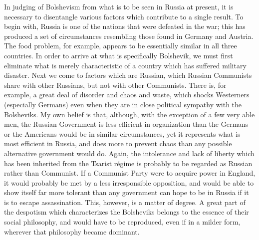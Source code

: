 In judging of Bolshevism from what is to be seen in Russia at present, it is necessary to disentangle various factors which contribute to a single result. To begin with, Russia is one of the nations that were defeated in the war; this has produced a set of circumstances resembling those found in Germany and Austria. The food problem, for example, appears to be essentially similar in all three countries. In order to arrive at what is specifically Bolshevik, we must first eliminate what is merely characteristic of a country which has suffered military disaster. Next we come to factors which are Russian, which Russian Communists share with other Russians, but not with other Communists. There is, for example, a great deal of disorder and chaos and waste, which shocks Westerners (especially Germans) even when they are in close political sympathy with the Bolsheviks. My own belief is that, although, with the exception of a few very able men, the Russian Government is less efficient in organization than the Germans or the Americans would be in similar circumstances, yet it represents what is most efficient in Russia, and does more to prevent chaos than any possible alternative government would do. Again, the intolerance and lack of liberty which has been inherited from the Tsarist régime is probably to be regarded as Russian rather than Communist. If a Communist Party were to acquire power in England, it would probably be met by a less irresponsible opposition, and would be able to show itself far more tolerant than any government can hope to be in Russia if it is to escape assassination. This, however, is a matter of degree. A great part of the despotism which characterizes the Bolsheviks belongs to the essence of their social philosophy, and would have to be reproduced, even if in a milder form, wherever that philosophy became dominant.

